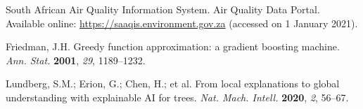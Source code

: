 \documentclass[11pt,a4paper]{article}
\begin{document}
\begin{thebibliography}{99}
South African Air Quality Information System. Air Quality Data Portal. Available online: \url{https://saaqis.environment.gov.za} (accessed on 1 January 2021).

Friedman, J.H. Greedy function approximation: a gradient boosting machine. \textit{Ann. Stat.} \textbf{2001}, \textit{29}, 1189--1232.

Lundberg, S.M.; Erion, G.; Chen, H.; et al. From local explanations to global understanding with explainable AI for trees. \textit{Nat. Mach. Intell.} \textbf{2020}, \textit{2}, 56--67.

\end{thebibliography}
\end{document}
